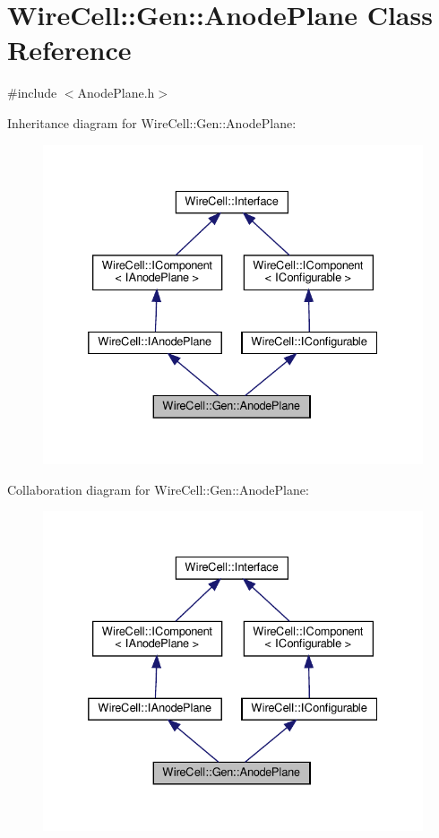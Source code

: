 \hypertarget{class_wire_cell_1_1_gen_1_1_anode_plane}{}\section{Wire\+Cell\+:\+:Gen\+:\+:Anode\+Plane Class Reference}
\label{class_wire_cell_1_1_gen_1_1_anode_plane}


{\ttfamily \#include $<$Anode\+Plane.\+h$>$}



Inheritance diagram for Wire\+Cell\+:\+:Gen\+:\+:Anode\+Plane\+:
\nopagebreak
\begin{figure}[H]
\begin{center}
\leavevmode
\includegraphics[width=332pt]{class_wire_cell_1_1_gen_1_1_anode_plane__inherit__graph}
\end{center}
\end{figure}


Collaboration diagram for Wire\+Cell\+:\+:Gen\+:\+:Anode\+Plane\+:
\nopagebreak
\begin{figure}[H]
\begin{center}
\leavevmode
\includegraphics[width=332pt]{class_wire_cell_1_1_gen_1_1_anode_plane__coll__graph}
\end{center}
\end{figure}
